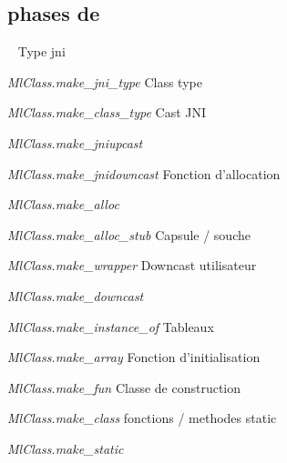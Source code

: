 \documentclass[a4paper, 11pt, notitlepage]{article}
\begin{document}
\subsection*{phases de }
\ 
\newline
Type jni

\emph{MlClass.make\_jni\_type}
\newline
Class type

\emph{MlClass.make\_class\_type}
\newline
Cast JNI

\emph{MlClass.make\_jniupcast}

\emph{MlClass.make\_jnidowncast}
\newline
Fonction d'allocation

\emph{MlClass.make\_alloc}

\emph{MlClass.make\_alloc\_stub}
\newline
Capsule / souche

\emph{MlClass.make\_wrapper}
\newline
Downcast utilisateur

\emph{MlClass.make\_downcast}

\emph{MlClass.make\_instance\_of}
\newline
Tableaux

\emph{MlClass.make\_array}
\newline
Fonction d'initialisation

\emph{MlClass.make\_fun}
\newline
Classe de construction

\emph{MlClass.make\_class}
\newline
fonctions / methodes static

\emph{MlClass.make\_static}
\end{document}
